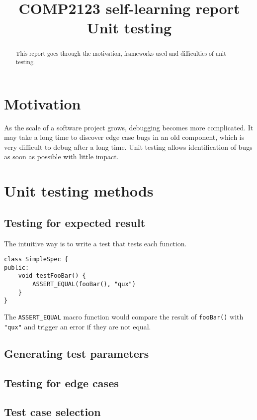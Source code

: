 \documentclass{article}
\title{COMP2123 self-learning report \\
Unit testing}
\begin{document}
\maketitle
\begin{abstract}
	This report goes through the motivation, frameworks used and difficulties of unit testing.
\end{abstract}
\newpage
\tableofcontents
\newpage

\section{Motivation}
As the scale of a software project grows, debugging becomes more complicated.
It may take a long time to discover edge case bugs in an old component, which is very difficult to debug after a long time.
Unit testing allows identification of bugs as soon as possible with little impact.

\section{Unit testing methods}
\subsection{Testing for expected result}
The intuitive way is to write a test that tests each function.

\begin{lstlisting}[style=CppStyle]
class SimpleSpec {
public:
	void testFooBar() {
		ASSERT_EQUAL(fooBar(), "qux")
	}
}
\end{lstlisting}

The \texttt{ASSERT\_EQUAL} macro function would compare the result of \texttt{fooBar()} with \texttt{"qux"} and trigger an error if they are not equal.

\subsection{Generating test parameters}

\subsection{Testing for edge cases}

\subsection{Test case selection}
\end{document}
